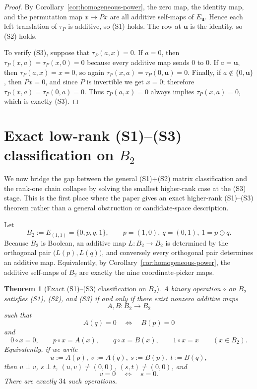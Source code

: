 \documentclass[11pt]{article}
\newtheorem{theorem}{Theorem}[section]
\theoremstyle{definition}
\theoremstyle{remark}
\numberwithin{equation}{section}
\newcommand{\op}{\oplus}
\newcommand{\perpdef}{\mathrel{\perp}}
\begin{document}
\begin{proof}
By Corollary~\ref{cor:homogeneous-power}, the zero map, the identity map, and the permutation map $x\mapsto Px$ are all additive self-maps of $E_{\mathbf u}$. Hence each left translation of $\tau_P$ is additive, so \textup{(S1)} holds. The row at $\mathbf u$ is the identity, so \textup{(S2)} holds.

To verify \textup{(S3)}, suppose that $\tau_P(a,x)=0$. If $a=0$, then $\tau_P(x,a)=\tau_P(x,0)=0$ because every additive map sends $0$ to $0$. If $a=\mathbf u$, then $\tau_P(a,x)=x=0$, so again $\tau_P(x,a)=\tau_P(0,\mathbf u)=0$. Finally, if $a\notin\{0,\mathbf u\}$, then $Px=0$, and since $P$ is invertible we get $x=0$; therefore $\tau_P(x,a)=\tau_P(0,a)=0$. Thus $\tau_P(a,x)=0$ always implies $\tau_P(x,a)=0$, which is exactly \textup{(S3)}.
\end{proof}

\section{Exact low-rank \textup{(S1)}--\textup{(S3)} classification on $B_2$}\label{sec:rank-two}
We now bridge the gap between the general \textup{(S1)}+\textup{(S2)} matrix classification and the rank-one chain collapse by solving the smallest higher-rank case at the \textup{(S3)} stage. This is the first place where the paper gives an exact higher-rank \textup{(S1)}--\textup{(S3)} theorem rather than a general obstruction or candidate-space description.

Let
\[
B_2:=E_{(1,1)}=\{0,p,q,1\},
\qquad
p=(1,0),\ q=(0,1),\ 1=p\op q.
\]
Because $B_2$ is Boolean, an additive map $L\colon B_2\to B_2$ is determined by the orthogonal pair $\bigl(L(p),L(q)\bigr)$, and conversely every orthogonal pair determines an additive map. Equivalently, by Corollary~\ref{cor:homogeneous-power}, the additive self-maps of $B_2$ are exactly the nine coordinate-picker maps.

\begin{theorem}[Exact \textup{(S1)}--\textup{(S3)} classification on $B_2$]\label{thm:B2-S123-classification}
A binary operation $\circ$ on $B_2$ satisfies \textup{(S1)}, \textup{(S2)}, and \textup{(S3)} if and only if there exist nonzero additive maps
\[
A,B\colon B_2\to B_2
\]
such that
\begin{equation}\label{eq:cross-zero-condition}
A(q)=0 \quad\Longleftrightarrow\quad B(p)=0
\end{equation}
and
\begin{equation}\label{eq:B2-row-form}
0\circ x=0,\qquad p\circ x=A(x),\qquad q\circ x=B(x),\qquad 1\circ x=x
\qquad (x\in B_2).
\end{equation}
Equivalently, if we write
\[
u:=A(p),\ v:=A(q),\ s:=B(p),\ t:=B(q),
\]
then $u\perpdef v$, $s\perpdef t$, $(u,v)\neq(0,0)$, $(s,t)\neq(0,0)$, and
\[
v=0 \quad\Longleftrightarrow\quad s=0.
\]
There are exactly $34$ such operations.
\end{theorem}
\end{document}
